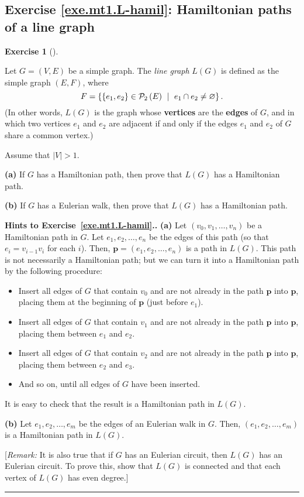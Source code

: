 \documentclass[numbers=enddot,12pt,final,onecolumn,notitlepage]{scrartcl}%
\newcounter{exer}
\theoremstyle{definition}
\newtheorem{exmp}[exer]{Exercise}
\newenvironment{exercise}[1][]
{\begin{exmp}[#1]\begin{leftbar}}
{\end{leftbar}\end{exmp}}
\newenvironment{proof}[1][Proof]{\noindent\textbf{#1.} }{\ \rule{0.5em}{0.5em}}
\newcommand{\powset}[2][]{\ifthenelse{\equal{#2}{}}{\mathcal{P}\left(#1\right)}{\mathcal{P}_{#1}\left(#2\right)}}
\newcommand{\set}[1]{\left\{ #1 \right\}}
\newcommand{\abs}[1]{\left| #1 \right|}
\newcommand{\tup}[1]{\left( #1 \right)}
\begin{document}
\subsection{Exercise \ref{exe.mt1.L-hamil}: Hamiltonian paths of a
line graph}

\begin{exercise} \label{exe.mt1.L-hamil}
Let $G = \tup{V, E}$ be a simple graph. The \textit{line graph}
$L \tup{G}$ is defined as the simple graph $\tup{E, F}$, where
\[
F = \set{ \set{e_1, e_2} \in \powset[2]{E}
            \ \mid \ e_1 \cap e_2 \neq \varnothing } .
\]
(In other words, $L \tup{G}$ is the graph whose \textbf{vertices}
are the \textbf{edges} of $G$, and in which two vertices $e_1$ and
$e_2$ are adjacent if and only if the edges $e_1$ and $e_2$ of $G$
share a common vertex.)

Assume that $\abs{V} > 1$.

\textbf{(a)} If $G$ has a Hamiltonian path, then prove that
$L \tup{G}$ has a Hamiltonian path.

\textbf{(b)} If $G$ has a Eulerian walk, then prove that $L \tup{G}$
has a Hamiltonian path.
\end{exercise}

\begin{proof}[Hints to Exercise~\ref{exe.mt1.L-hamil}.]
\textbf{(a)} Let $\tup{v_0, v_1, \ldots, v_n}$ be a Hamiltonian path
in $G$.
Let $e_1, e_2, \ldots, e_n$ be the edges of this path (so that
$e_i = v_{i-1} v_i$ for each $i$). Then,
$\mathbf{p} = \tup{e_1, e_2, \ldots, e_n}$ is a path in $L \tup{G}$.
This path is
not necessarily a Hamiltonian path; but we can turn it into a
Hamiltonian path by the following procedure:
\begin{itemize}
\item Insert all edges of $G$ that contain $v_0$ and are not already
in the path $\mathbf{p}$ into $\mathbf{p}$, placing them
at the beginning of $\mathbf{p}$ (just before $e_1$).
\item Insert all edges of $G$ that contain $v_1$ and are not already
in the path $\mathbf{p}$ into $\mathbf{p}$, placing them
between $e_1$ and $e_2$.
\item Insert all edges of $G$ that contain $v_2$ and are not already
in the path $\mathbf{p}$ into $\mathbf{p}$, placing them
between $e_2$ and $e_3$.
\item And so on, until all edges of $G$ have been inserted.
\end{itemize}
It is easy to check that the result is a Hamiltonian path in
$L \tup{G}$.

\textbf{(b)} Let $e_1, e_2, \ldots, e_m$ be the edges of an Eulerian
walk in $G$. Then, $\tup{e_1, e_2, \ldots, e_m}$ is a Hamiltonian
path in $L \tup{G}$.

[\textit{Remark:} It is also true that if $G$ has an Eulerian circuit,
then $L \tup{G}$ has an Eulerian circuit. To prove this, show that
$L \tup{G}$ is connected and that each vertex of $L \tup{G}$ has even
degree.]
\end{proof}
\end{document}
